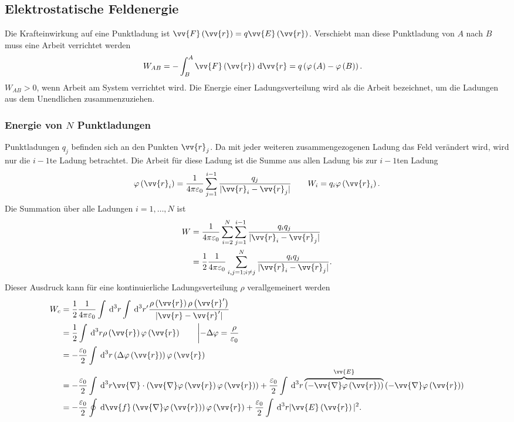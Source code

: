 \documentclass[a4paper,12pt]{article}
\newcommand{\td}{\,\text{d}}
\numberwithin{equation}{section}
\begin{document}
\subsection{Elektrostatische Feldenergie}
Die Krafteinwirkung auf eine Punktladung ist $\vv{F}\left(\vv{r}\right)=q\vv{E}\left(\vv{r}\right)$. Verschiebt man diese Punktladung von $A$ nach $B$ muss eine Arbeit verrichtet werden
\begin{align} 
        W_{AB}&=-\int_{B}^{A}\vv{F}\left(\vv{r}\right)\td \vv{r}=q\left(\varphi \left(A\right)-\varphi \left(B\right)\right)
.\end{align} 
$W_{AB}>0$, wenn Arbeit am System verrichtet wird. Die Energie einer Ladungsverteilung wird als die Arbeit bezeichnet, um die Ladungen aus dem Unendlichen zusammenzuziehen.

\subsubsection{Energie von $N$ Punktladungen}
Punktladungen $q_j$ befinden sich an den Punkten $\vv{r}_j$. Da mit jeder weiteren \glqq zusammengezogenen\grqq{} Ladung das Feld verändert wird, wird nur die $i-1$te Ladung betrachtet. Die Arbeit für diese Ladung ist die Summe aus allen Ladung bis zur $i-1$ten Ladung
\begin{align} 
        \varphi \left(\vv{r}_i\right)=\dfrac{1}{4\pi \varepsilon _0}\sum_{j=1}^{i-1}\dfrac{q_j}{|\vv{r}_i-\vv{r}_j|}\qquad W_i=q_i\varphi \left(\vv{r}_i\right)
.\end{align} 
Die Summation über alle Ladungen $i=1,\hdots ,N$ ist
\begin{align} 
        W&=\dfrac{1}{4\pi \varepsilon _0}\sum_{i=2}^{N}\sum_{j=1}^{i-1}\dfrac{q_iq_j}{|\vv{r}_i-\vv{r}_j|}\\
         &=\dfrac{1}{2}\dfrac{1}{4\pi \varepsilon _0}\sum_{i,j=1;i \neq j}^{N}\dfrac{q_iq_j}{|\vv{r}_i-\vv{r}_j|}
.\end{align} 
Dieser Ausdruck kann für eine kontinuierliche Ladungsverteilung $\rho $ verallgemeinert werden
\begin{align} 
        W_c&=\dfrac{1}{2}\dfrac{1}{4\pi \varepsilon _0}\int_{}^{}\td ^3r\int_{}^{}\td ^3r'\dfrac{\rho \left(\vv{r}\right)\rho \left(\vv{r}'\right)}{|\vv{r}-\vv{r}'|}\\
           &=\dfrac{1}{2}\int_{}^{}\td ^3r\rho \left(\vv{r}\right)\varphi \left(\vv{r}\right)\qquad \left|-\Delta \varphi =\dfrac{\rho }{\varepsilon _0}\right.\\
           &=-\dfrac{\varepsilon _0}{2}\int_{}^{}\td ^3r\left(\Delta \varphi \left(\vv{r}\right)\right)\varphi \left(\vv{r}\right)\\
           &=-\dfrac{\varepsilon _0}{2}\int_{}^{}\td ^3r\vv{\nabla }\cdot \left(\vv{\nabla }\varphi \left(\vv{r}\right)\varphi \left(\vv{r}\right)\right)+\dfrac{\varepsilon _0}{2}\int_{}^{}\td ^3r\overbrace{\left(-\vv{\nabla }\varphi \left(\vv{r}\right)\right)}^{\vv{E}}\left(-\vv{\nabla }\varphi \left(\vv{r}\right)\right)\\
           &=-\dfrac{\varepsilon _0}{2}\oint_{}^{}\td \vv{f}\left(\vv{\nabla }\varphi \left(\vv{r}\right)\right)\varphi \left(\vv{r}\right)+\dfrac{\varepsilon _0}{2}\int_{}^{}\td ^3r|\vv{E}\left(\vv{r}\right)|^2
.\end{align} 
\end{document}
